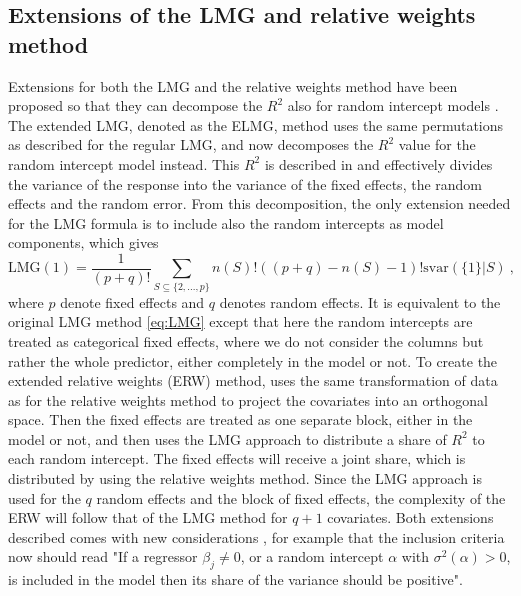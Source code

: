 \subsection{Extensions of the LMG and relative weights method}
Extensions for both the LMG and the relative weights method have been proposed so that they can decompose the $R^2$ also for random intercept models \citep{matre}. 
The extended LMG, denoted as the ELMG, method uses the same permutations as described for the regular LMG, and now decomposes the $R^2$ value for the random intercept model instead.
This $R^2$ is described in  and effectively divides the variance of the response into the variance of the fixed effects, the random effects and the random error.
From this decomposition, the only extension needed for the LMG formula is to include also the random intercepts as model components, which gives \citep{matre}
\begin{equation}
    \text{LMG}(1) = \frac{1}{(p+q)!} \sum_{S \subseteq \{2, ..., p\}} n(S)! ((p+q) - n(S)-1)! \text{svar}(\{1\} \lvert S) \ ,
\end{equation}
where $p$ denote fixed effects and $q$ denotes random effects. It is equivalent to the original LMG method \eqref{eq:LMG} except that here the random intercepts are treated as categorical fixed effects, where we do not consider the columns but rather the whole predictor, either completely in the model or not.
\newline
\newline
To create the extended relative weights (ERW) method, \citet{matre} uses the same transformation of data as for the relative weights method to project the covariates into an orthogonal space. 
Then the fixed effects are treated as one separate block, either in the model or not, and then uses the LMG approach to distribute a share of $R^2$ to each random intercept.
The fixed effects will receive a joint share, which is distributed by using the relative weights method.
Since the LMG approach is used for the $q$ random effects and the block of fixed effects, the complexity of the ERW will follow that of the LMG method for $q+1$ covariates.
\newline 
\newline
Both extensions described comes with new considerations \citep[for full details]{matre}, for example that the inclusion criteria now should read "If a regressor $\beta_j \neq 0$, or a random intercept $\alpha$ with $\sigma^2(\alpha) > 0$, is included in the model then its share of the variance should be positive".
